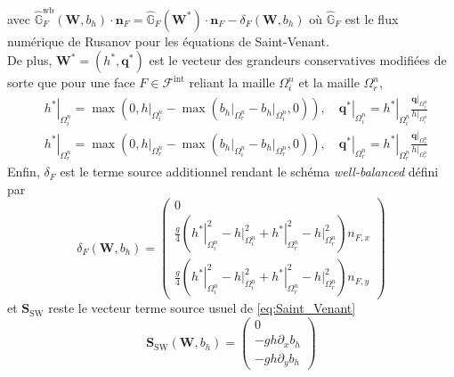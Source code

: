 \documentclass[11pt, a4paper, oneside]{report}
\newcommand{\restricdynamic}[2]{\left.#1\right\vert_{#2}}
\begin{document}
avec $\displaystyle \widehat{\mathbb{G}}_F^\text{wb}(\bm{W}, b_h) \cdot \bm{n}_F = \widehat{\mathbb{G}}_F \left( \bm{W}^* \right) \cdot \bm{n}_F - \delta_F \left( \bm{W}, b_h \right)$ où $\widehat{\mathbb{G}}_F$ est le flux numérique de Rusanov pour les équations de Saint-Venant. \\
De plus, $\bm{W}^* = (h^*, \bm{q}^*)$ est le vecteur des grandeurs conservatives modifiées de sorte que pour une face $F \in \mathcal{F}^\text{int}$ reliant la maille $\Omega_i^n$ et la maille $\Omega_r^n$,
\begin{equation}
    \begin{aligned}
        & \restricdynamic{h^*}{\Omega_i^n} = \max \left( 0, \restricdynamic{h}{\Omega_i^n} - \max \left( \restricdynamic{b_h}{\Omega_r^n} - \restricdynamic{b_h}{\Omega_i^n}, 0 \right) \right), \quad
        \restricdynamic{\bm{q}^*}{\Omega_i^n} = \restricdynamic{h^*}{\Omega_i^n} \frac{\restricdynamic{\bm{q}}{\Omega_i^n}}{\restricdynamic{h}{\Omega_i^n}} \\
        & \restricdynamic{h^*}{\Omega_r^n} = \max \left( 0, \restricdynamic{h}{\Omega_r^n} - \max \left( \restricdynamic{b_h}{\Omega_i^n} - \restricdynamic{b_h}{\Omega_r^n}, 0 \right) \right), \quad
        \restricdynamic{\bm{q}^*}{\Omega_r^n} = \restricdynamic{h^*}{\Omega_r^n} \frac{\restricdynamic{\bm{q}}{\Omega_r^n}}{\restricdynamic{h}{\Omega_r^n}}
    \end{aligned}
\end{equation}
Enfin, $\delta_F$ est le terme source additionnel rendant le schéma \textit{well-balanced} défini par
\begin{equation}
    \delta_F(\bm{W}, b_h) = \begin{pmatrix}
        0 \\
        \frac{g}{4} \left( \restricdynamic{h^*}{\Omega_i^n}^2 - \restricdynamic{h}{\Omega_i^n}^2 + \restricdynamic{h^*}{\Omega_r^n}^2 - \restricdynamic{h}{\Omega_r^n}^2 \right) n_{F, x} \\
        \frac{g}{4} \left( \restricdynamic{h^*}{\Omega_i^n}^2 - \restricdynamic{h}{\Omega_i^n}^2 + \restricdynamic{h^*}{\Omega_r^n}^2 - \restricdynamic{h}{\Omega_r^n}^2 \right) n_{F, y}
    \end{pmatrix}
\end{equation}
et $\bm{S}_\text{SW}$ reste le vecteur terme source usuel de \eqref{eq:Saint_Venant}
\begin{equation}
    \bm{S}_\text{SW}(\bm{W}, b_h) = \begin{pmatrix}
        0 \\
        - gh \partial_x b_h \\
        - gh \partial_y b_h
    \end{pmatrix}
\end{equation}
\end{document}
